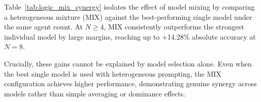 \documentclass{article}
\theoremstyle{plain}
\theoremstyle{definition}
\theoremstyle{remark}
\begin{document}
Table~\ref{tab:logic_mix_synergy} isolates the effect of model mixing by comparing
a heterogeneous mixture (MIX) against the best-performing single model under
the same agent count.
At $N \geq 4$, MIX consistently outperforms the strongest individual model by
large margins, reaching up to +14.28\% absolute accuracy at $N=8$.

Crucially, these gains cannot be explained by model selection alone.
Even when the best single model is used with heterogeneous prompting, the MIX
configuration achieves higher performance, demonstrating genuine synergy across
models rather than simple averaging or dominance effects.
\end{document}
